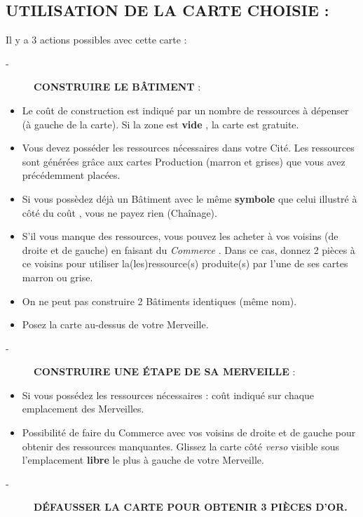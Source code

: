 \documentclass{scrartcl}%
\begin{document}
\subsection{ UTILISATION DE LA CARTE CHOISIE :
}%
\label{subsec:UTILISATIONDELACARTECHOISIE}%
Il y a 3 actions possibles avec cette carte :
%
\begin{description}%
\item[{-} ]%
%
\textbf{CONSTRUIRE LE BÂTIMENT}%
\textit{ }%
 :
%
\end{description}%
\begin{itemize}%
\item%
%
 Le coût de construction est indiqué par un nombre de ressources à dépenser (à gauche de la carte). Si la zone est %
\textbf{vide}%
, la carte est gratuite.
%
\item%
%
 Vous devez posséder les ressources nécessaires dans votre Cité. Les ressources sont générées grâce aux cartes Production (marron et grises) que vous avez précédemment placées.
%
\item%
%
 Si vous possèdez déjà un Bâtiment avec le même %
\textbf{symbole}%
\textit{ }%
 que celui illustré à côté du coût , vous ne payez rien (Chaînage).
%
\item%
%
 S'il vous manque des ressources, vous pouvez les acheter à vos voisins (de droite et de gauche) en faisant du %
\textit{Commerce}%
. Dans ce cas, donnez 2 pièces à ce voisins pour utiliser la(les)ressource(s) produite(s) par l'une de ses cartes marron ou grise.
%
\item%
%
 On ne peut pas construire 2 Bâtiments identiques (même nom).
%
\item%
%
 Posez la carte au{-}dessus de votre Merveille.
%
\end{itemize}%
\begin{description}%
\item[{-} ]%
%
\textbf{CONSTRUIRE UNE ÉTAPE DE SA MERVEILLE}%
\textit{ }%
 :
%
\end{description}%
\begin{itemize}%
\item%
%
 Si vous possédez les ressources nécessaires : coût indiqué sur chaque emplacement des Merveilles.
%
\item%
%
 Possibilité de faire du Commerce avec vos voisins de droite et de gauche pour obtenir des ressources manquantes. Glissez la carte côté %
\textit{verso}%
\textit{ }%
 visible sous l’emplacement %
\textbf{libre}%
\textit{ }%
 le plus à gauche de votre Merveille.
%
\end{itemize}%
\begin{description}%
\item[{-} ]%
%
\textbf{DÉFAUSSER LA CARTE POUR OBTENIR 3 PIÈCES D’OR.}%

%
\end{description}
\end{document}
